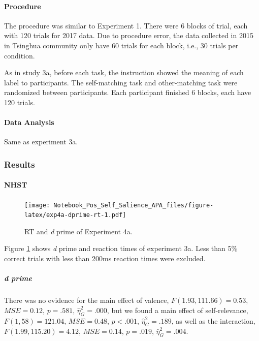 \documentclass[
  english,
  man]{apa6}
\let\oldparagraph\paragraph
\renewcommand{\paragraph}[1]{\oldparagraph{#1}\mbox{}}
\let\oldsubparagraph\subparagraph
\renewcommand{\subparagraph}[1]{\oldsubparagraph{#1}\mbox{}}
\begin{document}
\hypertarget{procedure-8}{%
\paragraph{Procedure}\label{procedure-8}}

The procedure was similar to Experiment 1. There were 6 blocks of trial, each with 120 trials for 2017 data. Due to procedure error, the data collected in 2015 in Tsinghua community only have 60 trials for each block, i.e., 30 trials per condition.

As in study 3a, before each task, the instruction showed the meaning of each label to participants. The self-matching task and other-matching task were randomized between participants. Each participant finished 6 blocks, each have 120 trials.

\hypertarget{data-analysis-9}{%
\paragraph{Data Analysis}\label{data-analysis-9}}

Same as experiment 3a.

\hypertarget{results-7}{%
\subsubsection{Results}\label{results-7}}

\hypertarget{nhst-6}{%
\paragraph{NHST}\label{nhst-6}}

\begin{figure}
\centering
\texttt{[image: Notebook\_Pos\_Self\_Salience\_APA\_files/figure-latex/exp4a-dprime-rt-1.pdf]}
\caption{\label{fig:exp4a-dprime-rt}RT and \emph{d} prime of Experiment 4a.}
\end{figure}

Figure \ref{fig:exp4a-dprime-rt} shows \emph{d} prime and reaction times of experiment 3a. Less than 5\% correct trials with less than 200ms reaction times were excluded.

\hypertarget{d-prime-7}{%
\subparagraph{d prime}\label{d-prime-7}}

There was no evidence for the main effect of valence, \(F(1.93, 111.66) = 0.53\), \(\mathit{MSE} = 0.12\), \(p = .581\), \(\hat{\eta}^2_G = .000\), but we found a main effect of self-relevance, \(F(1, 58) = 121.04\), \(\mathit{MSE} = 0.48\), \(p < .001\), \(\hat{\eta}^2_G = .189\), as well as the interaction, \(F(1.99, 115.20) = 4.12\), \(\mathit{MSE} = 0.14\), \(p = .019\), \(\hat{\eta}^2_G = .004\).
\end{document}
